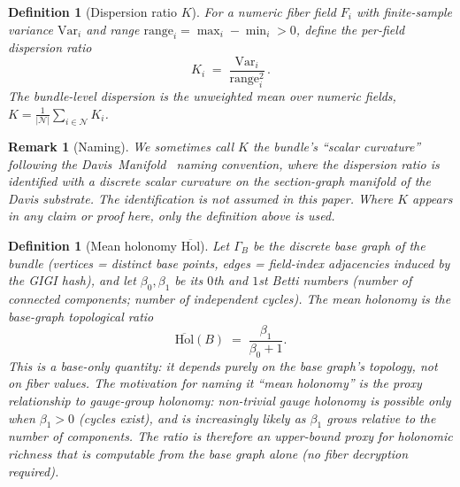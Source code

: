 \documentclass[11pt,letterpaper]{article}
\newtheorem{definition}[theorem]{Definition}
\newtheorem{remark}[theorem]{Remark}
\begin{document}
\begin{definition}[Dispersion ratio $K$]
\label{def:dispersion}
For a numeric fiber field $F_i$ with finite-sample variance
$\mathrm{Var}_i$ and range $\mathrm{range}_i = \max_i - \min_i > 0$,
define the per-field \emph{dispersion ratio}
\[
K_i \;=\; \frac{\mathrm{Var}_i}{\mathrm{range}_i^2}\,.
\]
The bundle-level dispersion is the unweighted mean over numeric
fields, $K = \frac{1}{|\mathcal{N}|}\sum_{i \in \mathcal{N}} K_i$.
\end{definition}

\begin{remark}[Naming]
We sometimes call $K$ the bundle's ``scalar curvature'' following the
Davis~Manifold~\cite{davis2026manifold} naming convention, where
the dispersion ratio is identified with a discrete scalar curvature on
the section-graph manifold of the Davis substrate. The identification
is not assumed in this paper. Where $K$ appears in any claim or proof
here, only the definition above is used.
\end{remark}

\begin{definition}[Mean holonomy $\overline{\mathrm{Hol}}$]
\label{def:hol-mean}
Let $\Gamma_{\!B}$ be the discrete base graph of the bundle
(vertices = distinct base points, edges = field-index adjacencies
induced by the GIGI hash), and let $\beta_0, \beta_1$ be its $0$th
and $1$st Betti numbers (number of connected components; number
of independent cycles). The \emph{mean holonomy} is the
base-graph topological ratio
\[
\overline{\mathrm{Hol}}(B) \;=\; \frac{\beta_1}{\beta_0 + 1}.
\]
This is a base-only quantity: it depends purely on the base graph's
topology, not on fiber values. The motivation for naming it ``mean
holonomy'' is the proxy relationship to gauge-group holonomy:
non-trivial gauge holonomy is possible only when $\beta_1 > 0$
(cycles exist), and is increasingly likely as $\beta_1$ grows
relative to the number of components. The ratio is therefore an
upper-bound proxy for holonomic richness that is computable from
the base graph alone (no fiber decryption required).
\end{definition}
\end{document}
